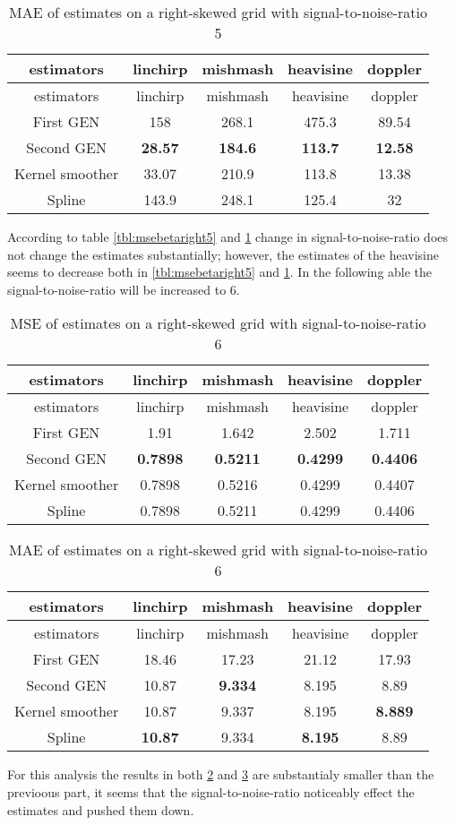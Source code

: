 \documentclass[12pt,twoside, a4paper]{reedthesis}
\begin{document}
\begin{longtable}[]{@{}ccccc@{}}
\caption{\label{tbl:maebetaright5}MAE of estimates on a right-skewed grid with signal-to-noise-ratio 5}\tabularnewline
\toprule
estimators & linchirp & mishmash & heavisine & doppler\tabularnewline
\midrule
\endfirsthead
\toprule
estimators & linchirp & mishmash & heavisine & doppler\tabularnewline
\midrule
\endhead
First GEN & 158 & 268.1 & 475.3 & 89.54\tabularnewline
Second GEN & \textbf{28.57} & \textbf{184.6} & \textbf{113.7} & \textbf{12.58}\tabularnewline
Kernel smoother & 33.07 & 210.9 & 113.8 & 13.38\tabularnewline
Spline & 143.9 & 248.1 & 125.4 & 32\tabularnewline
\bottomrule
\end{longtable}
According to table \ref{tbl:msebetaright5} and \ref{tbl:maebetaright5} change in signal-to-noise-ratio does not change the estimates substantially; however, the estimates of the heavisine seems to decrease both in \ref{tbl:msebetaright5} and \ref{tbl:maebetaright5}. In the following able the signal-to-noise-ratio will be increased to 6.
\begin{longtable}[]{@{}ccccc@{}}
\caption{\label{tbl:msebetaright6}MSE of estimates on a right-skewed grid with signal-to-noise-ratio 6}\tabularnewline
\toprule
estimators & linchirp & mishmash & heavisine & doppler\tabularnewline
\midrule
\endfirsthead
\toprule
estimators & linchirp & mishmash & heavisine & doppler\tabularnewline
\midrule
\endhead
First GEN & 1.91 & 1.642 & 2.502 & 1.711\tabularnewline
Second GEN & \textbf{0.7898} & \textbf{0.5211} & \textbf{0.4299} & \textbf{0.4406}\tabularnewline
Kernel smoother & 0.7898 & 0.5216 & 0.4299 & 0.4407\tabularnewline
Spline & 0.7898 & 0.5211 & 0.4299 & 0.4406\tabularnewline
\bottomrule
\end{longtable}
\begin{longtable}[]{@{}ccccc@{}}
\caption{\label{tbl:maebetaright6}MAE of estimates on a right-skewed grid with signal-to-noise-ratio 6}\tabularnewline
\toprule
estimators & linchirp & mishmash & heavisine & doppler\tabularnewline
\midrule
\endfirsthead
\toprule
estimators & linchirp & mishmash & heavisine & doppler\tabularnewline
\midrule
\endhead
First GEN & 18.46 & 17.23 & 21.12 & 17.93\tabularnewline
Second GEN & 10.87 & \textbf{9.334} & 8.195 & 8.89\tabularnewline
Kernel smoother & 10.87 & 9.337 & 8.195 & \textbf{8.889}\tabularnewline
Spline & \textbf{10.87} & 9.334 & \textbf{8.195} & 8.89\tabularnewline
\bottomrule
\end{longtable}
For this analysis the results in both \ref{tbl:msebetaright6} and \ref{tbl:maebetaright6} are substantialy smaller than the previoous part, it seems that the signal-to-noise-ratio noticeably effect the estimates and pushed them down.
\end{document}
